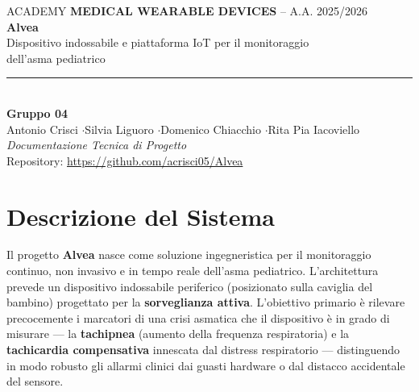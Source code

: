 \documentclass[11pt,a4paper]{article}
\begin{document}
\begin{center}
  {\footnotesize ACADEMY \textbf{MEDICAL WEARABLE DEVICES} -- A.A. 2025/2026}\\[1.2em]
  {\Huge\bfseries Alvea}\\[0.6em]
  {\large Dispositivo indossabile e piattaforma IoT per il monitoraggio\\ dell'asma pediatrico}\\[1.4em]
  \rule{0.7\textwidth}{0.4pt}\\[0.8em]
  {\normalsize\textbf{Gruppo 04}}\\[0.3em]
  {\small Antonio Crisci \quad$\cdot$\quad Silvia Liguoro \quad$\cdot$\quad Domenico Chiacchio \quad$\cdot$\quad Rita Pia Iacoviello}\\[1.0em]
  {\small\textit{Documentazione Tecnica di Progetto}}\\[0.4em]
  {\footnotesize Repository: \url{https://github.com/acrisci05/Alvea}}
\end{center}

\vspace{0.4em}

\begin{center}
\end{center}

\vspace{0.6em}
\newpage
{\small\renewcommand{\contentsname}{Indice}\tableofcontents}

\newpage
\section{Descrizione del Sistema}

Il progetto \textbf{Alvea} nasce come soluzione ingegneristica per il monitoraggio continuo, non invasivo e in tempo reale dell'asma pediatrico. L'architettura prevede un dispositivo indossabile periferico (posizionato sulla caviglia del bambino) progettato per la \textbf{sorveglianza attiva}. L'obiettivo primario è rilevare precocemente i marcatori di una crisi asmatica che il dispositivo è in grado di misurare --- la \textbf{tachipnea} (aumento della frequenza respiratoria) e la \textbf{tachicardia compensativa} innescata dal distress respiratorio --- distinguendo in modo robusto gli allarmi clinici dai guasti hardware o dal distacco accidentale del sensore.
\end{document}
